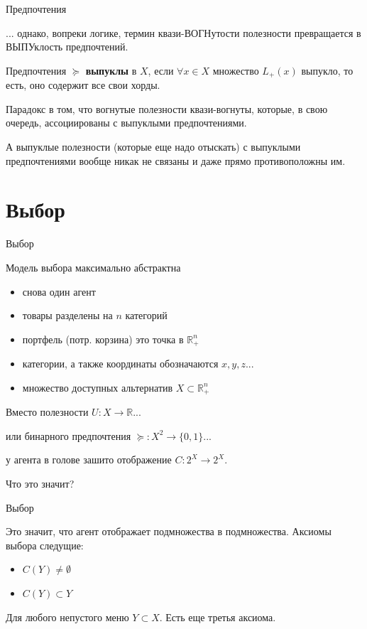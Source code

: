 \documentclass{beamer}
\begin{document}
\begin{frame}{Предпочтения}

... однако, вопреки логике, термин квази-ВОГНутости полезности превращается в ВЫПУклость предпочтений.

\begin{definition}
Предпочтения $\succcurlyeq$ \textbf{выпуклы} в $X$, если $\forall x \in X$ множество $L_{+}(x)$ выпукло, то есть, оно содержит все свои хорды. 
\end{definition}

Парадокс в том, что вогнутые полезности квази-вогнуты, которые, в свою очередь, ассоциированы с выпуклыми предпочтениями. 

А выпуклые полезности (которые еще надо отыскать) с выпуклыми предпочтениями вообще никак не связаны и даже прямо противоположны им. 

\end{frame}

\section{Выбор}

\begin{frame}{Выбор}

Модель выбора максимально абстрактна

\begin{itemize}
\item снова один агент
\item товары разделены на $n$ категорий
\item портфель (потр. корзина) это точка в $\mathbb{R}_{+}^{n}$	
\item категории, а также координаты обозначаются $x, y, z...$
\item множество доступных альтернатив $X \subset \mathbb{R}_{+}^{n}$
\end{itemize}

Вместо полезности $U: X \to \mathbb{R}$...

или бинарного предпочтения $\succcurlyeq: X^2 \to \{0,1\}$...

у агента в голове зашито отображение $C: 2^X \to 2^X$. 

Что это значит?

\end{frame}

\begin{frame}{Выбор}

Это значит, что агент отображает подмножества в подмножества. Аксиомы выбора следущие:

\begin{itemize}
  \item $C(Y) \neq \emptyset$
  \item $C(Y) \subset Y$
\end{itemize}

Для любого непустого меню $Y \subset X$. Есть еще третья аксиома.

\end{frame}
\end{document}
